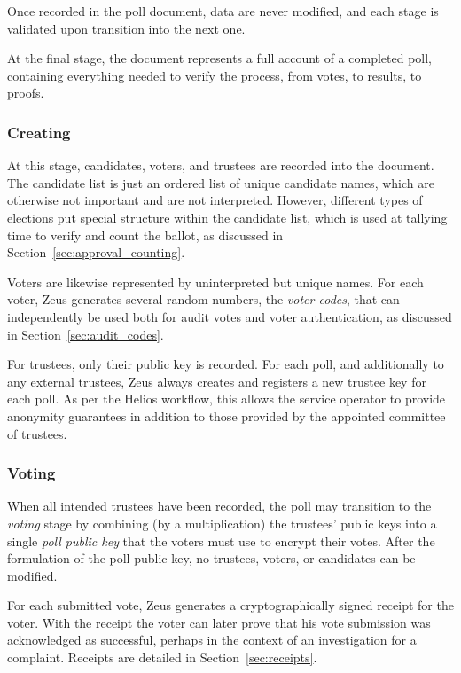 \documentclass[letterpaper,10pt]{article}
\begin{document}
Once recorded in the poll document, data are never modified,
and each stage is validated upon transition into the next one.

At the final stage,
the document represents a full account of a completed poll,
containing everything needed to verify the process,
from votes, to results, to proofs.

\subsubsection{Creating}
\label{sec:creating}

At this stage, candidates, voters, and trustees
are recorded into the document.
The candidate list is just an ordered list of unique candidate names,
which are otherwise not important and are not interpreted.
However, different types of elections put special structure
within the candidate list, which is used at tallying time
to verify and count the ballot,
as discussed in Section~\ref{sec:approval_counting}.

Voters are likewise represented by uninterpreted but unique names.
For each voter,
Zeus generates several random numbers, the \emph{voter codes}, that can
independently be used both for audit votes and voter authentication,
as discussed in Section~\ref{sec:audit_codes}.

For trustees, only their public key is recorded.
For each poll, and additionally to any external trustees,
Zeus always creates and registers a new trustee key for each poll.
As per the Helios workflow, this allows the service operator to
provide anonymity guarantees in addition to those provided by
the appointed committee of trustees.

\subsubsection{Voting}
\label{sec:voting}
When all intended trustees have been recorded,
the poll may transition to the \emph{voting} stage
by combining (by a multiplication)
the trustees' public keys into a single \emph{poll public key}
that the voters must use to encrypt their votes.
After the formulation of the poll public key,
no trustees, voters, or candidates can be modified.

For each submitted vote, Zeus generates a cryptographically signed
receipt for the voter.
With the receipt the voter can later prove that
his vote submission was acknowledged as successful,
perhaps in the context of an investigation for a complaint.
Receipts are detailed in Section~\ref{sec:receipts}.
\end{document}
